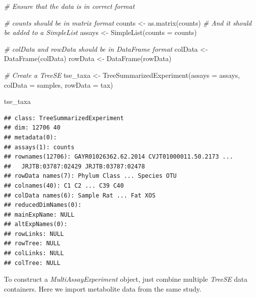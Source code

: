 \documentclass[
]{book}
\newenvironment{Shaded}{\begin{snugshade}}{\end{snugshade}}
\newcommand{\AttributeTok}[1]{\textcolor[rgb]{0.77,0.63,0.00}{#1}}
\newcommand{\CommentTok}[1]{\textcolor[rgb]{0.56,0.35,0.01}{\textit{#1}}}
\newcommand{\FunctionTok}[1]{\textcolor[rgb]{0.00,0.00,0.00}{#1}}
\newcommand{\NormalTok}[1]{#1}
\newcommand{\OtherTok}[1]{\textcolor[rgb]{0.56,0.35,0.01}{#1}}
\begin{document}
\begin{Shaded}
\begin{Highlighting}[]
\CommentTok{\# Ensure that the data is in correct format}

\CommentTok{\# counts should be in matrix format}
\NormalTok{counts }\OtherTok{\textless{}{-}} \FunctionTok{as.matrix}\NormalTok{(counts)}
\CommentTok{\# And it should be added to a SimpleList}
\NormalTok{assays }\OtherTok{\textless{}{-}}  \FunctionTok{SimpleList}\NormalTok{(}\AttributeTok{counts =}\NormalTok{ counts)}

\CommentTok{\# colData and rowData should be in DataFrame format}
\NormalTok{colData }\OtherTok{\textless{}{-}} \FunctionTok{DataFrame}\NormalTok{(colData)}
\NormalTok{rowData }\OtherTok{\textless{}{-}} \FunctionTok{DataFrame}\NormalTok{(rowData)}

\CommentTok{\# Create a TreeSE}
\NormalTok{tse\_taxa }\OtherTok{\textless{}{-}} \FunctionTok{TreeSummarizedExperiment}\NormalTok{(}\AttributeTok{assays =}\NormalTok{ assays,}
                                     \AttributeTok{colData =}\NormalTok{ samples,}
                                     \AttributeTok{rowData =}\NormalTok{ tax)}

\NormalTok{tse\_taxa}
\end{Highlighting}
\end{Shaded}

\begin{verbatim}
## class: TreeSummarizedExperiment 
## dim: 12706 40 
## metadata(0):
## assays(1): counts
## rownames(12706): GAYR01026362.62.2014 CVJT01000011.50.2173 ...
##   JRJTB:03787:02429 JRJTB:03787:02478
## rowData names(7): Phylum Class ... Species OTU
## colnames(40): C1 C2 ... C39 C40
## colData names(6): Sample Rat ... Fat XOS
## reducedDimNames(0):
## mainExpName: NULL
## altExpNames(0):
## rowLinks: NULL
## rowTree: NULL
## colLinks: NULL
## colTree: NULL
\end{verbatim}

To construct a \emph{MultiAssayExperiment} object, just combine multiple \emph{TreeSE} data containers.
Here we import metabolite data from the same study.
\end{document}
